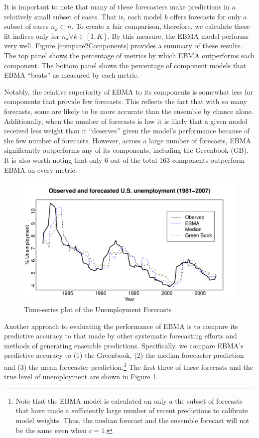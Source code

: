 \documentclass[12pt,fullpage,endnotes]{article}
\begin{document}
It is important to note that many of these forecasters make
predictions in a relatively small subset of cases.  That is, each
model $k$ offers forecasts for only a subset of cases $n_k \subset n$.
To create a fair comparison, therefore, we calculate these fit indices
only for $n_k \forall k \in [1,K]$.  By this measure, the EBMA model
performs very well.  Figure \ref{compare2Components} provides a
summary of these results.  The top panel shows the percentage of
metrics by which EBMA outperforms each component. The bottom panel
shows the percentage of component models that EBMA ``beats'' as
measured by each metric.

Notably, the relative superiority of EBMA to its components is
somewhat less for components that provide few forecasts.  This
reflects the fact that with so many forecasts, some are likely to be
more accurate than the ensemble by chance alone. Additionally, when the number of forecasts is low it is likely that a given model received less weight than it ``deserves'' given the model's performance because of the few number of forecasts. However, across a
large number of forecasts, EBMA significantly outperforms any of its
components, including the Greenbook (GB).  It is also worth noting
that only 6 out of the total 163 components outperform EBMA on every
metric.

\begin{figure}[h]
\caption{Time-series plot of the Unemployment Forecasts}
\label{timeSeries}
\begin{center}
\includegraphics[scale=.8]{timeSeries}
\end{center}
\end{figure}


Another approach to evaluating the performance of EBMA is to compare
its predictive accuracy to that made by other systematic forecasting
efforts and methods of generating ensemble predictions.  Specifically,
we compare EBMA's predictive accuracy to (1) the Greenbook, (2) the
median forecaster prediction and (3) the mean forecaster
prediction.\footnote{Note that the EBMA model is calculated on only a the
  subset of forecasts that have made a sufficiently large number of
  recent predictions to calibrate model weights.  Thus, the median
  forecast and the ensemble forecast will not be the same even when
  $c=1$.  }  The first three of these forecasts and the true level of
unemployment are shown in Figure \ref{timeSeries}.
\end{document}
